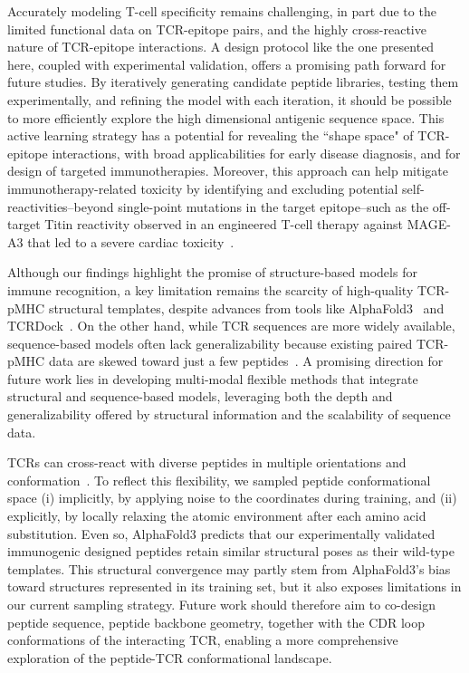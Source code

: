 Accurately modeling T-cell specificity remains challenging, in part due to the limited functional
data on {TCR-epitope} pairs, and the highly cross-reactive nature of {TCR-epitope} interactions. A
design protocol like the one presented here, coupled with experimental validation, offers a
promising path forward for future {studies}. By iteratively generating candidate peptide libraries,
testing them experimentally, and refining the model with each iteration, it should be possible to
more efficiently explore the high dimensional antigenic sequence space. This active learning
strategy has a potential for revealing the ``shape space" of {TCR-epitope} interactions, with broad
applicabilities for early disease diagnosis, and for design of targeted immunotherapies. Moreover,
this approach can help mitigate immunotherapy-related toxicity by identifying and excluding
potential self-reactivities--beyond single-point mutations in the target epitope--such as the
off-target Titin reactivity observed in an engineered T-cell therapy against MAGE-A3 that led to a
severe cardiac toxicity~\cite{Linette2013-tc}.

Although our findings highlight the promise of structure-based models for immune recognition, a key
limitation remains the scarcity of high-quality TCR-pMHC structural templates, despite advances from
tools like AlphaFold3~\cite{Abramson2024-jp} and TCRDock~\cite{Bradley2023-rl}. On the other hand,
while TCR sequences are more widely available, sequence-based models often lack generalizability
because existing paired TCR-pMHC data are skewed toward just a few
peptides~\cite{Shugay2018-nt,Vita2019-qn}. A promising direction for future work lies in developing
multi-modal flexible methods that integrate structural and sequence-based models, leveraging both
the depth and generalizability offered by structural information and the scalability of sequence
data.

TCRs can cross-react with diverse peptides in multiple orientations and
conformation~\cite{Riley2018-zi}. To reflect this flexibility, we sampled peptide conformational
space (i) implicitly, by applying noise to the coordinates during training, and (ii) explicitly, by
locally relaxing the atomic environment after each amino acid substitution. Even so, AlphaFold3
predicts that our experimentally validated immunogenic designed peptides retain similar structural
poses as their wild-type templates. This structural convergence may partly stem from AlphaFold3's
bias toward structures represented in its training set, but it also exposes limitations in our
current sampling strategy. Future work should therefore aim to co-design peptide sequence, peptide
backbone geometry, together with the CDR loop conformations of the interacting TCR, enabling a more
comprehensive exploration of the peptide-TCR conformational landscape.

